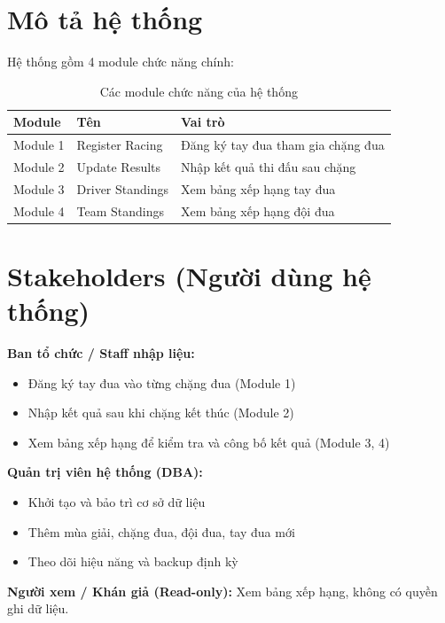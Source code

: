 \documentclass[13pt, a4paper]{report}
\begin{document}
\section{Mô tả hệ thống}

Hệ thống gồm 4 module chức năng chính:

\begin{table}[h]
\centering
\caption{Các module chức năng của hệ thống}
\begin{tabularx}{\textwidth}{C{2cm} L{4cm} L{7cm}}
\toprule
{}
\textcolor{tableheadfg}{\textbf{Module}} &
\textcolor{tableheadfg}{\textbf{Tên}} &
\textcolor{tableheadfg}{\textbf{Vai trò}} \\
\midrule
Module 1 & Register Racing     & Đăng ký tay đua tham gia chặng đua \\
Module 2 & Update Results      & Nhập kết quả thi đấu sau chặng \\
Module 3 & Driver Standings    & Xem bảng xếp hạng tay đua \\
Module 4 & Team Standings      & Xem bảng xếp hạng đội đua \\
\bottomrule
\end{tabularx}
\end{table}

\section{Stakeholders (Người dùng hệ thống)}

\textbf{Ban tổ chức / Staff nhập liệu:}
\begin{itemize}[leftmargin=1.5cm]
  \item Đăng ký tay đua vào từng chặng đua (Module 1)
  \item Nhập kết quả sau khi chặng kết thúc (Module 2)
  \item Xem bảng xếp hạng để kiểm tra và công bố kết quả (Module 3, 4)
\end{itemize}

\textbf{Quản trị viên hệ thống (DBA):}
\begin{itemize}[leftmargin=1.5cm]
  \item Khởi tạo và bảo trì cơ sở dữ liệu
  \item Thêm mùa giải, chặng đua, đội đua, tay đua mới
  \item Theo dõi hiệu năng và backup định kỳ
\end{itemize}

\textbf{Người xem / Khán giả (Read-only):} Xem bảng xếp hạng, không có quyền ghi dữ liệu.
\end{document}
